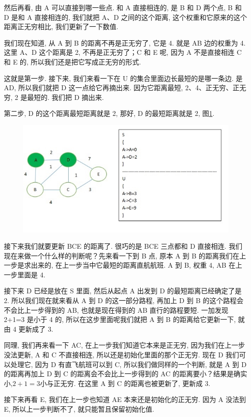 然后再看, 由 A 可以直接到哪一些点. 和 A 直接相连的, 是 B 和 D 两个点, B 和 D 是和 A 直接相连的, 我们就把 A、D 之间的这个距离, 这个权重和它原来的这个距离正无穷相比, 我们更新了一下数值. 

我们现在知道, 从 A 到 B 的距离不再是正无穷了, 它是 4. 就是 AB 边的权重为 4. 这里 A、D 这个距离是 2, 不再是正无穷了；C 和 E 呢, 因为 A 不是直接相连 C 和 E 的, 所以我们还是把它写成正无穷的形式. 

这就是第一步. 接下来, 我们来看一下在 U 的集合里面边长最短的是哪一条边. 是 AD, 所以我们就把 D 这一点给它再摘出来. 因为它距离最短, 2、4、正无穷、正无穷, 2 是最短的. 我们把 D 摘出来. 

第二步, D 的这个距离最短距离就是 2, 那好, D 的最短距离就是 2, 图\ref{fig:img26_4}. 

\begin{figure}[ht]
  \centering
  \includegraphics[width=0.7\linewidth]{asset/20230924051223.jpg}
  \caption{}
  \label{fig:img26_4}
\end{figure}

接下来我们就要更新 BCE 的距离了. 很巧的是 BCE 三点都和 D 直接相连. 我们现在来做一个什么样的判断呢？先来看一下到 B 点, 原本 A 到 B 的距离我们在上一步是求出来的, 在上一步当中它最短的距离直航航班. A 到 B, 权重 4, AB 在上一步里面是 4. 

接下来 D 已经是放在 S 里面, 然后从起点 A 出发到 D 的最短距离已经确定了是 2. 所以我们现在就来看从 A 到 D 的这一部分路程, 再加上 D 到 B 的这个路程会不会比上一步得到的 AB, 也就是现在得到的 AB 直行的路程要短. 一加发现 2+1=3 是小于 4 的, 所以在这步里面呢我们就把 A 到 B 的距离给它更新一下, 就由 4 更新成了 3. 

同理, 我们再来看一下 AC, 在上一步我们知道它本来是正无穷, 因为我们在上一步没法更新, A 和 C 不直接相连, 所以还是初始化里面的那个正无穷. 现在 D 我们可以处理它, 因为 D 有直飞航班可以到 C, 所以我们做同样的一个判断, 就是 A 到 D 的距离再加上 D 到 C 的距离会不会比上一步得到的 AC 的距离要小？结果是确实小,$ 2+1=3$小与正无穷. 在这里 A 到 C 的距离也被更新了, 更新成 3. 

接下来再看 E, 我们在上一步也知道 AE 本来还是初始化的正无穷. 因为 A 没法到 E, 所以上一步判断不了, 就只能暂且保留初始化值. 

